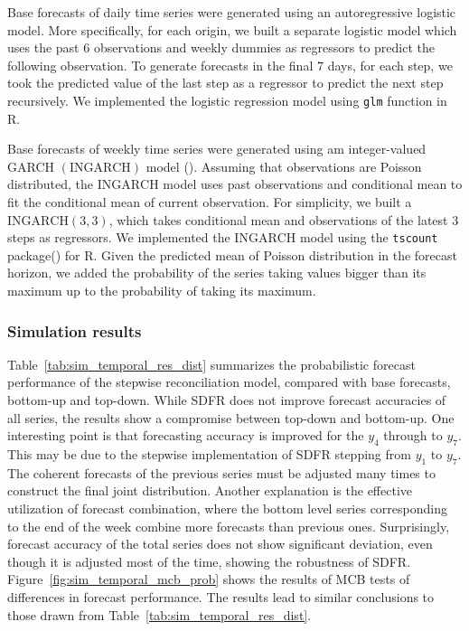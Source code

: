 \documentclass[a4paper,review,12pt,authoryear]{elsarticle}
\let\code=\texttt
\let\proglang=\textsf
\begin{document}
     Base forecasts of daily time series were generated using an autoregressive logistic model. 
     More specifically, for each origin, we built a separate logistic model which uses the past $6$ observations and weekly dummies as regressors to predict the following observation. 
     To generate forecasts in the final $7$ days, for each step, we took the predicted value of the last step as a regressor to predict the next step recursively. We implemented the logistic regression model using \code{glm} function in \proglang{R}.
     
     Base forecasts of weekly time series were generated using am integer-valued GARCH $(\textrm{INGARCH})$ model (). 
     Assuming that observations are Poisson distributed, the $\textrm{INGARCH}$ model uses past observations and conditional mean to fit the conditional mean of current observation.
     For simplicity, we built a $\textrm{INGARCH}(3, 3)$, which takes conditional mean and observations of the latest $3$ steps as regressors. 
     We implemented the $\textrm{INGARCH}$ model using the \code{tscount} package() for \proglang{R}.
     Given the predicted mean of Poisson distribution in the forecast horizon, we added the probability of the series taking values bigger than its maximum up to the probability of taking its maximum.
     
     \subsubsection{Simulation results}
     
     Table~\ref{tab:sim_temporal_res_dist} summarizes the probabilistic forecast performance of the stepwise reconciliation model, compared with base forecasts, bottom-up and top-down.
     While SDFR does not improve forecast accuracies of all series, the results
     show a compromise between top-down and bottom-up. 
     One interesting point is that forecasting accuracy is improved for the $y_4$ through to $y_7$. 
     This may be due to the stepwise implementation of SDFR stepping from $y_1$ to $y_7$. The coherent forecasts of the previous series must be adjusted many times to construct the final joint distribution.
     Another explanation is the effective utilization of forecast combination, where the bottom level series corresponding to the end of the week combine more forecasts than previous ones.
     Surprisingly, forecast accuracy of the total series does not show significant deviation,  even though it is adjusted most of the time, showing the robustness of SDFR.
     Figure~\ref{fig:sim_temporal_mcb_prob} shows the results of MCB tests of differences in forecast performance. The results lead to similar conclusions to those drawn from Table~\ref{tab:sim_temporal_res_dist}. 
     
\end{document}
